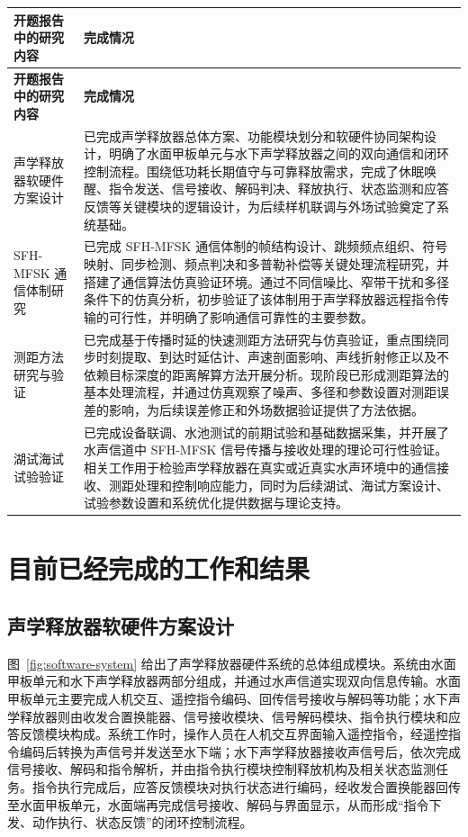 {\small
\begin{longtable}{|p{5.6cm}|p{8.0cm}|}
\hline
\textbf{开题报告中的研究内容} & \textbf{完成情况} \\
\hline
\endfirsthead
\hline
\textbf{开题报告中的研究内容} & \textbf{完成情况} \\
\hline
\endhead
声学释放器软硬件方案设计 & 已完成声学释放器总体方案、功能模块划分和软硬件协同架构设计，明确了水面甲板单元与水下声学释放器之间的双向通信和闭环控制流程。围绕低功耗长期值守与可靠释放需求，完成了休眠唤醒、指令发送、信号接收、解码判决、释放执行、状态监测和应答反馈等关键模块的逻辑设计，为后续样机联调与外场试验奠定了系统基础。 \\
\hline
SFH-MFSK 通信体制研究 & 已完成 SFH-MFSK 通信体制的帧结构设计、跳频频点组织、符号映射、同步检测、频点判决和多普勒补偿等关键处理流程研究，并搭建了通信算法仿真验证环境。通过不同信噪比、窄带干扰和多径条件下的仿真分析，初步验证了该体制用于声学释放器远程指令传输的可行性，并明确了影响通信可靠性的主要参数。 \\
\hline
测距方法研究与验证 & 已完成基于传播时延的快速测距方法研究与仿真验证，重点围绕同步时刻提取、到达时延估计、声速剖面影响、声线折射修正以及不依赖目标深度的距离解算方法开展分析。现阶段已形成测距算法的基本处理流程，并通过仿真观察了噪声、多径和参数设置对测距误差的影响，为后续误差修正和外场数据验证提供了方法依据。 \\
\hline
湖试海试试验验证 & 已完成设备联调、水池测试的前期试验和基础数据采集，并开展了水声信道中 SFH-MFSK 信号传播与接收处理的理论可行性验证。相关工作用于检验声学释放器在真实或近真实水声环境中的通信接收、测距处理和控制响应能力，同时为后续湖试、海试方案设计、试验参数设置和系统优化提供数据与理论支持。 \\
\hline
\end{longtable}
}

\section{目前已经完成的工作和结果}

\subsection{声学释放器软硬件方案设计}

图~\ref{fig:software-system} 给出了声学释放器硬件系统的总体组成模块。系统由水面甲板单元和水下声学释放器两部分组成，并通过水声信道实现双向信息传输。水面甲板单元主要完成人机交互、遥控指令编码、回传信号接收与解码等功能；水下声学释放器则由收发合置换能器、信号接收模块、信号解码模块、指令执行模块和应答反馈模块构成。系统工作时，操作人员在人机交互界面输入遥控指令，经遥控指令编码后转换为声信号并发送至水下端；水下声学释放器接收声信号后，依次完成信号接收、解码和指令解析，并由指令执行模块控制释放机构及相关状态监测任务。指令执行完成后，应答反馈模块对执行状态进行编码，经收发合置换能器回传至水面甲板单元，水面端再完成信号接收、解码与界面显示，从而形成“指令下发、动作执行、状态反馈”的闭环控制流程。

